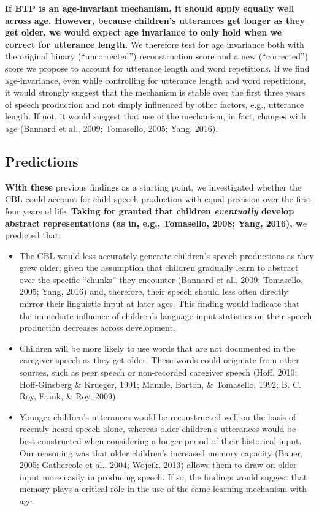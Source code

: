 \documentclass[man,mask,floatsintext]{apa6}
\providecommand{\tightlist}{%
  \setlength{\itemsep}{0pt}\setlength{\parskip}{0pt}}
\begin{document}
\textbf{If BTP is an age-invariant mechanism, it should apply equally
well across age. However, because children's utterances get longer as
they get older, we would expect age invariance to only hold when we
correct for utterance length.} We therefore test for age invariance both
with the original binary (\enquote{uncorrected}) reconstruction score
and a new (\enquote{corrected}) score we propose to account for
utterance length and word repetitions. If we find age-invariance, even
while controlling for utterance length and word repetitions, it would
strongly suggest that the mechanism is stable over the first three years
of speech production and not simply influenced by other factors, e.g.,
utterance length. If not, it would suggest that use of the mechanism, in
fact, changes with age (Bannard et al., 2009; Tomasello, 2005; Yang,
2016).

\subsection{Predictions}\label{predictions}

\textbf{With these} previous findings as a starting point, we
investigated whether the CBL could account for child speech production
with equal precision over the first four years of life. \textbf{Taking
for granted that children \emph{eventually} develop abstract
representations (as in, e.g., Tomasello, 2008; Yang, 2016), w}e
predicted that:

\begin{itemize}
\tightlist
\item
  The CBL would less accurately generate children's speech productions
  as they grew older; given the assumption that children gradually learn
  to abstract over the specific \enquote{chunks} they encounter (Bannard
  et al., 2009; Tomasello, 2005; Yang, 2016) and, therefore, their
  speech should less often directly mirror their linguistic input at
  later ages. This finding would indicate that the immediate influence
  of children's language input statistics on their speech production
  decreases across development.
\item
  Children will be more likely to use words that are not documented in
  the caregiver speech as they get older. These words could originate
  from other sources, such as peer speech or non-recorded caregiver
  speech (Hoff, 2010; Hoff-Ginsberg \& Krueger, 1991; Mannle, Barton, \&
  Tomasello, 1992; B. C. Roy, Frank, \& Roy, 2009).
\item
  Younger children's utterances would be reconstructed well on the basis
  of recently heard speech alone, whereas older children's utterances
  would be best constructed when considering a longer period of their
  historical input. Our reasoning was that older children's increased
  memory capacity (Bauer, 2005; Gathercole et al., 2004; Wojcik, 2013)
  allows them to draw on older input more easily in producing speech. If
  so, the findings would suggest that memory plays a critical role in
  the use of the same learning mechanism with age.
\end{itemize}
\end{document}
